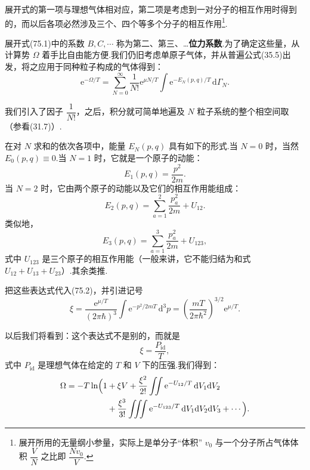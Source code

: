 展开式的第一项与理想气体相对应，第二项是考虑到一对分子的相互作用时得到的，而以后各项必然涉及三个、四个等多个分子的相互作用\footnote{展开所用的无量纲小参量，实际上是单分子“体积” $v_0$ 与一个分子所占气体体积 $\dfrac{V}{N}$ 之比即 $\dfrac{Nv_0}{V}$.}.

展开式(75.1)中的系数 $B,C,\cdots$ 称为第二、第三、…\textbf{位力系数}.为了确定这些量，从计算势 $\Omega$ 着手比自由能方便.我们仍旧考虑单原子气体，并从普遍公式(35.5)出发，将之应用于同种粒子构成的气体得到：
\begin{equation}
  \mathrm{e}^{-\Omega/T}=\sum_{N=0}^{\infty}\frac{1}{N!}\mathrm{e}^{\mu N/T}
  \int\mathrm{e}^{-E_N(p,q)/T}\,\mathrm{d}\varGamma_N.
\end{equation}

我们引入了因子 $\dfrac{1}{N!}$，之后，积分就可简单地遍及 $N$ 粒子系统的整个相空间取（参看(31.7)）.

在对 $N$ 求和的依次各项中，能量 $E_N(p,q)$ 具有如下的形式.当 $N=0$ 时，当然 $E_0(p,q)\equiv0$.当 $N=1$ 时，它就是一个原子的动能：
\begin{equation*}
  E_1(p,q)=\frac{p^2}{2m}.
\end{equation*}
当 $N=2$ 时，它由两个原子的动能以及它们的相互作用能组成：
\begin{equation*}
  E_2(p,q)=\sum_{a=1}^{2}\frac{p_a^2}{2m}+U_{12}.
\end{equation*}
类似地，
\begin{equation*}
  E_3(p,q)=\sum_{a=1}^{3}\frac{p_a^2}{2m}+U_{123},
\end{equation*}
式中 $U_{123}$ 是三个原子的相互作用能（一般来讲，它不能归结为和式 $U_{12}+U_{13}+U_{23}$）.其余类推.

把这些表达式代入(75.2)，并引进记号
\begin{equation}
  \xi=\frac{\mathrm{e}^{\mu/T}}{(2\pi\hbar)^3}\int\mathrm{e}^{-p^2/2mT}\,\mathrm{d}^3p
  =\left(\frac{mT}{2\pi\hbar^2}\right)^{3/2}\mathrm{e}^{\mu/T}.
\end{equation}

以后我们将看到：这个表达式不是别的，而就是
\begin{equation*}
  \xi=\frac{P_{\mathrm{id}}}{T},
\end{equation*}
式中 $P_{\mathrm{id}}$ 是理想气体在给定的 $T$ 和 $V$ 下的压强.我们得到：
\begin{equation*}
\begin{aligned}
  \Omega=-T\ln\Bigl(1&+\xi V+\frac{\xi^2}{2!}\iint\mathrm{e}^{-U_{12}/T}\,\mathrm{d}V_1\mathrm{d}V_2\\
  &+\frac{\xi^3}{3!}\iiint\mathrm{e}^{-U_{123}/T}\,\mathrm{d}V_1\mathrm{d}V_2\mathrm{d}V_3+\cdots\Bigr).
\end{aligned}
\end{equation*}

